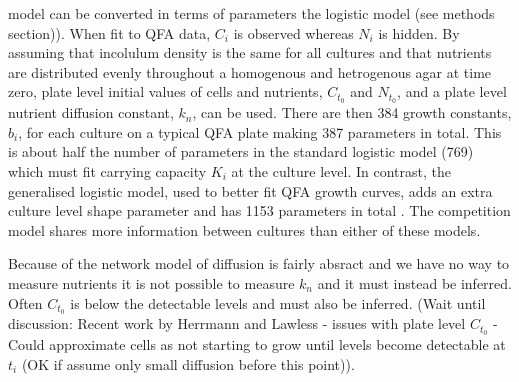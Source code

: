 model can be converted in terms of parameters the logistic model (see
methods section)). When fit to QFA data, \(C_{i}\) is observed whereas
\(N_{i}\) is hidden. By assuming that incolulum density is the same
for all cultures and that nutrients are distributed evenly throughout
a homogenous and hetrogenous agar at time zero, plate level initial
values of cells and nutrients, \(C_{t_{0}}\) and \(N_{t_{0}}\), and a
plate level nutrient diffusion constant, \(k_{n}\), can be used. There
are then 384 growth constants, \(b_{i}\), for each culture on a
typical QFA plate making 387 parameters in total. This is about half
the number of parameters in the standard logistic model (769) which
must fit carrying capacity \(K_{i}\) at the culture level. In
contrast, the generalised logistic model, used to better fit QFA
growth curves, adds an extra culture level shape parameter and has
1153 parameters in total \citep{Banks2012,qfa2016}. The competition
model shares more information between cultures than either of these
models.


Because of the network model of diffusion is fairly absract and we
have no way to measure nutrients it is not possible to measure \(k_n\)
and it must instead be inferred. Often \(C_{t_{0}}\) is below the
detectable levels and must also be inferred. (Wait until discussion:
Recent work by Herrmann and Lawless - issues with plate level
\(C_{t_{0}}\) - Could approximate cells as not starting to grow until
levels become detectable at \(t_{i}\) (OK if assume only small
diffusion before this point)).


